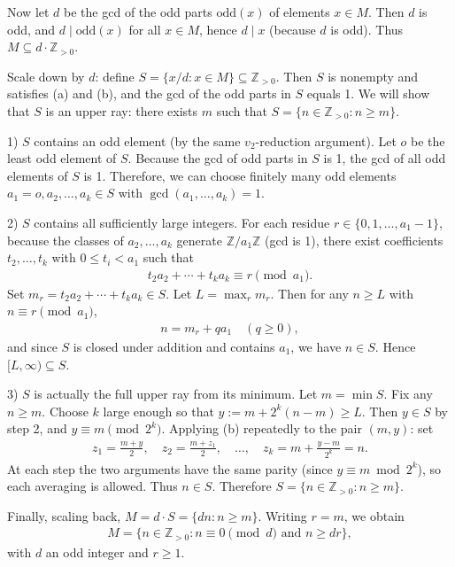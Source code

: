 \documentclass[12pt,a4paper]{article}
\theoremstyle{definition}
\begin{document}
    Now let $d$ be the gcd of the odd parts $\text{odd}(x)$ of elements $x \in M$. Then $d$ is odd, and $d \mid \text{odd}(x)$ for all $x \in M$, hence $d \mid x$ (because $d$ is odd). Thus $M \subseteq d\cdot\mathbb{Z}_{>0}$.

    Scale down by $d$: define $S = \{x/d : x \in M\} \subseteq \mathbb{Z}_{>0}$. Then $S$ is nonempty and satisfies (a) and (b), and the gcd of the odd parts in $S$ equals 1. We will show that $S$ is an upper ray: there exists $m$ such that $S = \{n \in \mathbb{Z}_{>0} : n \geq m\}$.

    1) $S$ contains an odd element (by the same $v_2$-reduction argument). Let $o$ be the least odd element of $S$. Because the gcd of odd parts in $S$ is 1, the gcd of all odd elements of $S$ is 1. Therefore, we can choose finitely many odd elements $a_1=o, a_2, \ldots, a_k \in S$ with $\gcd(a_1,\ldots,a_k)=1$.

    2) $S$ contains all sufficiently large integers. For each residue $r \in \{0,1,\ldots,a_1-1\}$, because the classes of $a_2,\ldots,a_k$ generate $\mathbb{Z}/a_1\mathbb{Z}$ (gcd is 1), there exist coefficients $t_2,\ldots,t_k$ with $0 \leq t_i < a_1$ such that
    \begin{align}
        t_2 a_2 + \cdots + t_k a_k \equiv r \pmod{a_1}.
    \end{align}
    Set $m_r = t_2 a_2 + \cdots + t_k a_k \in S$. Let $L = \max_r m_r$. Then for any $n \geq L$ with $n \equiv r \pmod{a_1}$,
    \begin{align}
        n = m_r + q a_1 \quad (q \geq 0),
    \end{align}
    and since $S$ is closed under addition and contains $a_1$, we have $n \in S$. Hence $[L, \infty) \subseteq S$.

    3) $S$ is actually the full upper ray from its minimum. Let $m = \min S$. Fix any $n \geq m$. Choose $k$ large enough so that $y := m + 2^k (n - m) \geq L$. Then $y \in S$ by step 2, and $y \equiv m \pmod{2^k}$. Applying (b) repeatedly to the pair $(m, y)$: set
    \begin{align}
        z_1 = \frac{m + y}{2}, \quad z_2 = \frac{m + z_1}{2}, \quad \ldots, \quad z_k = m + \frac{y - m}{2^k} = n.
    \end{align}
    At each step the two arguments have the same parity (since $y \equiv m \bmod 2^k$), so each averaging is allowed. Thus $n \in S$. Therefore $S = \{n \in \mathbb{Z}_{>0} : n \geq m\}$.

    Finally, scaling back, $M = d\cdot S = \{d n : n \geq m\}$. Writing $r = m$, we obtain
    \begin{align}
        M = \{n \in \mathbb{Z}_{>0} : n \equiv 0 \pmod{d} \text{ and } n \geq dr\},
    \end{align}
    with $d$ an odd integer and $r \geq 1$.
\end{document}
